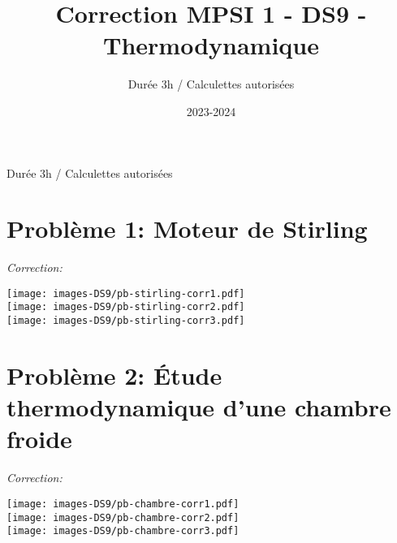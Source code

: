 \documentclass[
  10pt,
  french,
  a4paper,
  DIV=18]{scrartcl}
\title{Correction MPSI 1 - DS9 - Thermodynamique}
\subtitle{Durée 3h / Calculettes autorisées}
\date{2023-2024}
\begin{document}
\begin{center}
  \begin{tcolorbox}[width=0.95\textwidth,colback=gray!10!white,colframe=gray!75!black]
    	
        \medskip
    {\large Durée 3h / Calculettes autorisées}
      \end{tcolorbox}
\end{center}




\section*{Problème 1: Moteur de
Stirling}\label{probluxe8me-1-moteur-de-stirling}

{\sffamily \emph{Correction:}

\begin{center}

\texttt{[image: images-DS9/pb-stirling-corr1.pdf]}\\
\texttt{[image: images-DS9/pb-stirling-corr2.pdf]}\\
\texttt{[image: images-DS9/pb-stirling-corr3.pdf]}

\end{center}

}

\section*{Problème 2: Étude thermodynamique d'une chambre
froide}\label{probluxe8me-2-uxe9tude-thermodynamique-dune-chambre-froide}

{\sffamily \emph{Correction:}

\begin{center}

\texttt{[image: images-DS9/pb-chambre-corr1.pdf]}\\
\texttt{[image: images-DS9/pb-chambre-corr2.pdf]}\\
\texttt{[image: images-DS9/pb-chambre-corr3.pdf]}

\end{center}

}
\end{document}
